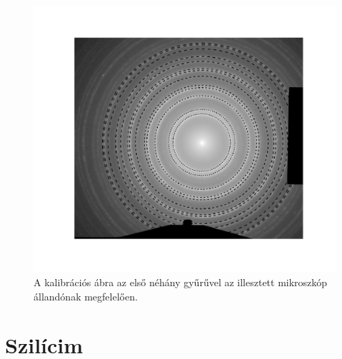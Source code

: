 \documentclass[pdftex,12pt,a4paper]{article}
\begin{document}
		\begin{figure}[H]
			\centering
			\includegraphics[scale=0.5]{gyuruk.pdf}
			\caption{A kalibrációs ábra az első néhány gyűrűvel az illesztett mikroszkóp állandónak megfelelően.}
			\label{gyuruk}
		\end{figure}
	\section{Szilícim}
		
\end{document}
